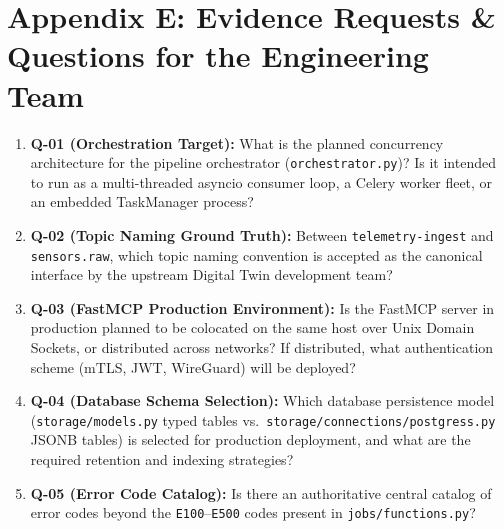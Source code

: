 \documentclass[10pt,a4paper]{report}
\begin{document}
\section{Appendix E: Evidence Requests \& Questions for the Engineering Team}
\begin{enumerate}[leftmargin=*]
  \item \textbf{Q-01 (Orchestration Target):} What is the planned concurrency architecture for the pipeline orchestrator (\texttt{orchestrator.py})? Is it intended to run as a multi-threaded asyncio consumer loop, a Celery worker fleet, or an embedded TaskManager process?
  \item \textbf{Q-02 (Topic Naming Ground Truth):} Between \texttt{telemetry-ingest} and \texttt{sensors.raw}, which topic naming convention is accepted as the canonical interface by the upstream Digital Twin development team?
  \item \textbf{Q-03 (FastMCP Production Environment):} Is the FastMCP server in production planned to be colocated on the same host over Unix Domain Sockets, or distributed across networks? If distributed, what authentication scheme (mTLS, JWT, WireGuard) will be deployed?
  \item \textbf{Q-04 (Database Schema Selection):} Which database persistence model (\texttt{storage/models.py} typed tables vs.\ \texttt{storage/connections/postgress.py} JSONB tables) is selected for production deployment, and what are the required retention and indexing strategies?
  \item \textbf{Q-05 (Error Code Catalog):} Is there an authoritative central catalog of error codes beyond the \texttt{E100}--\texttt{E500} codes present in \texttt{jobs/functions.py}?
\end{enumerate}
\end{document}
